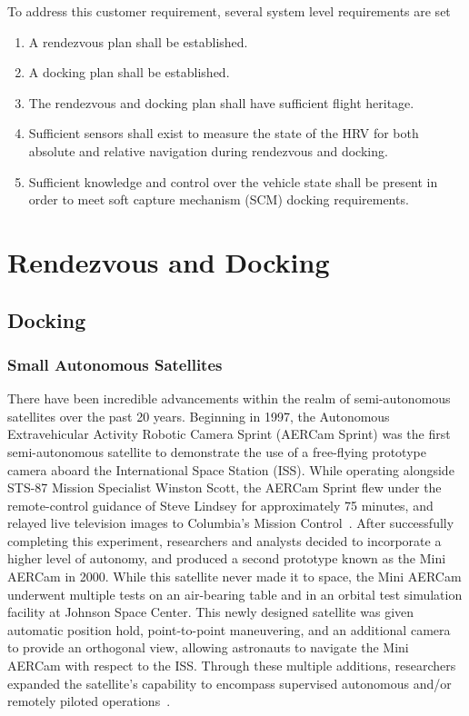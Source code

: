 \documentclass[onecolumn,10pt]{jhwhw}
\begin{document}
To address this customer requirement, several system level requirements are set
\begin{enumerate}
\item A rendezvous plan shall be established.
\item A docking plan shall be established.
\item The rendezvous and docking plan shall have sufficient flight heritage.
\item Sufficient sensors shall exist to measure the state of the HRV for both absolute and relative navigation during rendezvous and docking.
\item Sufficient knowledge and control over the vehicle state shall be present in order to meet soft capture mechanism (SCM) docking requirements.
\end{enumerate}

\chapter{Rendezvous and Docking}

\section{Docking}
\subsection{Small Autonomous Satellites}
There have been incredible advancements within the realm of semi-autonomous satellites over the past 20 years. Beginning in 1997, the Autonomous Extravehicular Activity Robotic Camera Sprint (AERCam Sprint) was the first semi-autonomous satellite to demonstrate the use of a free-flying prototype camera aboard the International Space Station (ISS). While operating alongside STS-87 Mission Specialist Winston Scott, the AERCam Sprint flew under the remote-control guidance of Steve Lindsey for approximately 75 minutes, and relayed live television images to Columbia's Mission Control~\cite{Aercam,MiniAercam}. After successfully completing this experiment, researchers and analysts decided to incorporate a higher level of autonomy, and produced a second prototype known as the Mini AERCam in 2000. While this satellite never made it to space, the Mini AERCam underwent multiple tests on an air-bearing table and in an orbital test simulation facility at Johnson Space Center. This newly designed satellite was given automatic position hold, point-to-point maneuvering, and an additional camera to provide an orthogonal view, allowing astronauts to navigate the Mini AERCam with respect to the ISS. Through these multiple additions, researchers expanded the satellite's capability to encompass supervised autonomous and/or remotely piloted operations~\cite{MiniAercam,MiniAercam2}.
\end{document}

